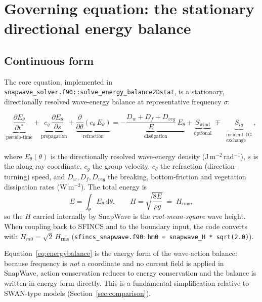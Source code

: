\documentclass[11pt,a4paper]{article}
\newcommand{\ee}{E_\theta}
\newcommand{\dd}{\mathrm{d}}
\newcommand{\code}[1]{\texttt{#1}}
\begin{document}
\section{Governing equation: the stationary directional energy balance}
\label{sec:governing}

\subsection{Continuous form}

The core equation, implemented in
\code{snapwave\_solver.f90::solve\_energy\_balance2Dstat}, is a stationary,
directionally resolved wave-energy balance at representative frequency
$\sigma$:

\begin{equation}
\underbrace{\frac{\partial \ee}{\partial t^{*}}}_{\text{pseudo-time}}
+\underbrace{c_g\,\frac{\partial \ee}{\partial s}}_{\text{propagation}}
+\underbrace{\frac{\partial}{\partial \theta}\!\left(c_\theta\,\ee\right)}_{\text{refraction}}
=
-\underbrace{\frac{D_{w}+D_{f}+D_{veg}}{E}\,\ee}_{\text{dissipation}}
+\underbrace{S_{\mathrm{wind}}}_{\text{optional}}
\;\mp\;
\underbrace{S_{ig}}_{\substack{\text{incident--IG}\\\text{exchange}}},
\label{eq:energybalance}
\end{equation}

where $\ee(\theta)$ is the directionally resolved wave-energy density
(J\,m$^{-2}$\,rad$^{-1}$), $s$ is the along-ray coordinate, $c_g$ the group
velocity, $c_\theta$ the refraction (direction-turning) speed, and
$D_w,D_f,D_{veg}$ the breaking, bottom-friction and vegetation dissipation
rates (W\,m$^{-2}$). The total energy is
\begin{equation}
E=\int_{\theta}\ee\,\dd\theta,\qquad
H=\sqrt{\frac{8E}{\rho g}} \;=\; H_{\mathrm{rms}},
\label{eq:Hrms}
\end{equation}
so the $H$ carried internally by SnapWave is the \emph{root-mean-square} wave
height. When coupling back to SFINCS and to the boundary input, the code
converts with $H_{m0}=\sqrt{2}\,H_{\mathrm{rms}}$
(\code{sfincs\_snapwave.f90}: \code{hm0 = snapwave\_H * sqrt(2.0)}).

Equation~\eqref{eq:energybalance} is the energy form of the wave-action
balance: because frequency is \emph{not} a coordinate and no current field is
applied in SnapWave, action conservation reduces to energy conservation and the
balance is written in energy form directly. This is a fundamental simplification
relative to SWAN-type models (Section~\ref{sec:comparison}).
\end{document}
